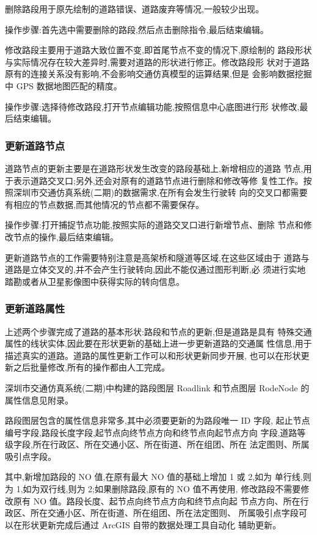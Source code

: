 删除路段用于原先绘制的道路错误、道路废弃等情况,一般较少出现。

操作步骤:首先选中需要删除的路段,然后点击删除指令,最后结束编辑。

修改路段主要用于道路大致位置不变,即首尾节点不变的情况下,原绘制的
路段形状与实际情况存在较大差异时,需要对道路的形状进行修正。修改路段形
状对于道路原有的连接关系没有影响,不会影响交通仿真模型的运算结果,但是
会影响数据挖掘中 GPS 数据地图匹配的精度。

操作步骤:选择待修改路段,打开节点编辑功能,按照信息中心底图进行形
状修改,最后结束编辑。

\subsubsection{更新道路节点}
道路节点的更新主要是在道路形状发生改变的路段基础上,新增相应的道路
节点,用于表示道路交叉口;另外,还会对原有的道路节点进行删除和修改等修
复性工作。按照深圳市交通仿真系统(二期)的数据需求,在所有会发生行驶转
向的交叉口都需要有相应的节点数据,而其他情况的节点都不需要保存。

操作步骤:打开捕捉节点功能,按照实际的道路交叉口进行新增节点、删除
节点和修改节点的操作,最后结束编辑。

更新道路节点的工作需要特别注意是高架桥和隧道等区域,在这些区域由于
道路与道路是立体交叉的,并不会产生行驶转向,因此不能仅通过图形判断,必
须进行实地踏勘或者从卫星影像图中获得实际的转向信息。

\subsubsection{更新道路属性}
上述两个步骤完成了道路的基本形状:路段和节点的更新,但是道路是具有
特殊交通属性的线状实体,因此要在形状更新的基础上进一步更新道路的交通属
性信息,用于描述真实的道路。道路的属性更新工作可以和形状更新同步开展,
也可以在形状更新之后批量修改,所有的操作都由人工完成。

深圳市交通仿真系统(二期)中构建的路段图层 Roadlink 和节点图层
RodeNode 的属性信息见附录。

路段图层包含的属性信息非常多,其中必须要更新的为路段唯一 ID 字段,
起止节点编号字段,路段长度字段,起节点向终节点方向和终节点向起节点方向
字段,道路等级字段,所在行政区、所在交通小区、所在街道、所在组团、所在
法定图则、所属吸引点字段。

其中,新增加路段的 NO 值,在原有最大 NO 值的基础上增加 1 或 2,如为
单行线,则为 1,如为双行线,则为 2;如果删除路段,原有的 NO 值不再使用,
修改路段不需要修改原有 NO 值。路段长度、起节点向终节点方向和终节点向起
节点方向、所在行政区、所在交通小区、所在街道、所在组团、所在法定图则、
所属吸引点字段可以在形状更新完成后通过 ArcGIS 自带的数据处理工具自动化
辅助更新。

